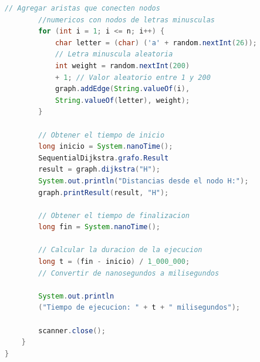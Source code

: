 \begin{lstlisting}[language=Java, style=ColorStyle]
        // Agregar aristas que conecten nodos 
        //numericos con nodos de letras minusculas
        for (int i = 1; i <= n; i++) {
            char letter = (char) ('a' + random.nextInt(26)); 
            // Letra minuscula aleatoria
            int weight = random.nextInt(200) 
            + 1; // Valor aleatorio entre 1 y 200
            graph.addEdge(String.valueOf(i),
            String.valueOf(letter), weight);
        }

        // Obtener el tiempo de inicio
        long inicio = System.nanoTime();
        SequentialDijkstra.grafo.Result 
        result = graph.dijkstra("H");
        System.out.println("Distancias desde el nodo H:");
        graph.printResult(result, "H");

        // Obtener el tiempo de finalizacion
        long fin = System.nanoTime();

        // Calcular la duracion de la ejecucion
        long t = (fin - inicio) / 1_000_000; 
        // Convertir de nanosegundos a milisegundos

        System.out.println
        ("Tiempo de ejecucion: " + t + " milisegundos");

        scanner.close();
    }
}


\end{lstlisting}

